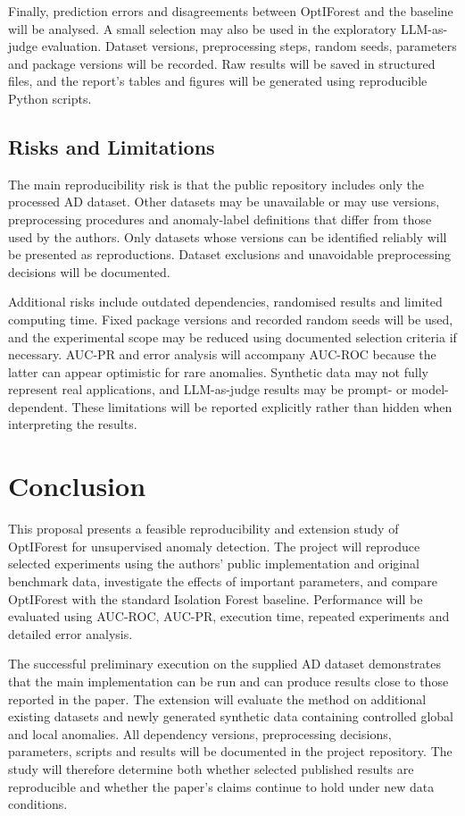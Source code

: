 \documentclass[11pt]{article}
\begin{document}
Finally, prediction errors and disagreements between OptIForest and the
baseline will be analysed. A small selection may also be used in the
exploratory LLM-as-judge evaluation. Dataset versions, preprocessing
steps, random seeds, parameters and package versions will be recorded.
Raw results will be saved in structured files, and the report's tables
and figures will be generated using reproducible Python scripts.

\subsection{Risks and Limitations}
The main reproducibility risk is that the public repository includes only
the processed AD dataset. Other datasets may be unavailable or may use
versions, preprocessing procedures and anomaly-label definitions that
differ from those used by the authors. Only datasets whose versions can
be identified reliably will be presented as reproductions. Dataset
exclusions and unavoidable preprocessing decisions will be documented.

Additional risks include outdated dependencies, randomised results and
limited computing time. Fixed package versions and recorded random seeds
will be used, and the experimental scope may be reduced using documented
selection criteria if necessary. AUC-PR and error analysis will accompany
AUC-ROC because the latter can appear optimistic for rare anomalies.
Synthetic data may not fully represent real applications, and
LLM-as-judge results may be prompt- or model-dependent. These limitations
will be reported explicitly rather than hidden when interpreting the
results.

\section{Conclusion}
This proposal presents a feasible reproducibility and extension study of
OptIForest for unsupervised anomaly detection. The project will reproduce
selected experiments using the authors' public implementation and
original benchmark data, investigate the effects of important parameters,
and compare OptIForest with the standard Isolation Forest baseline.
Performance will be evaluated using AUC-ROC, AUC-PR, execution time,
repeated experiments and detailed error analysis.

The successful preliminary execution on the supplied AD dataset
demonstrates that the main implementation can be run and can produce
results close to those reported in the paper. The extension will evaluate
the method on additional existing datasets and newly generated synthetic
data containing controlled global and local anomalies. All dependency
versions, preprocessing decisions, parameters, scripts and results will
be documented in the project repository. The study will therefore
determine both whether selected published results are reproducible and
whether the paper's claims continue to hold under new data conditions.

% 

\end{document}
